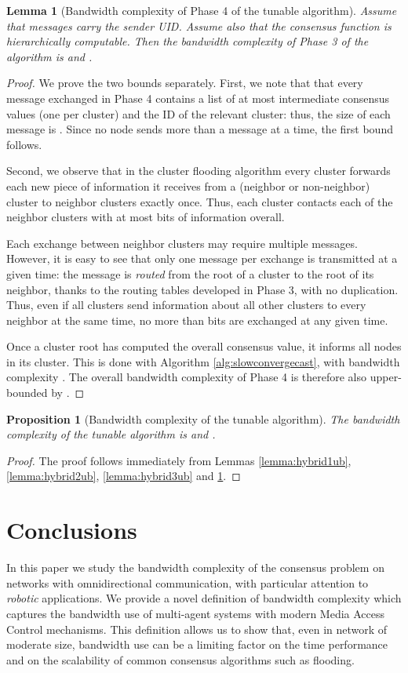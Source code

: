 \documentclass[letterpaper,10pt,conference]{ieeeconf}
\newtheorem{proposition}[theorem]{Proposition}
\newtheorem{lemma}[theorem]{Lemma}
\begin{document}
\begin{lemma}[Bandwidth complexity of Phase 4 of the tunable algorithm]
\label{lemma:hybrid4ub}
Assume that messages carry the sender UID. Assume also that the consensus function is hierarchically computable. Then the bandwidth complexity of Phase 3 of the algorithm is  and  .
\end{lemma}
\begin{proof}
We prove the two bounds separately. First, we note that that every message exchanged in Phase 4 contains a list of at most  intermediate consensus values (one per cluster) and the ID of the relevant cluster: thus, the size of each message is . Since no node sends more than a message at a time, the first bound follows.

Second, we observe that in the cluster flooding algorithm every cluster forwards each new piece of information it receives from a (neighbor or non-neighbor) cluster to neighbor clusters exactly once. Thus, each cluster contacts each of the  neighbor clusters with at most  bits of information overall.

Each exchange between neighbor clusters may require multiple messages. However, it is easy to see that only one message per exchange is transmitted at a given time: the message is \emph{routed} from the root of a cluster to the root of its neighbor, thanks to the routing tables developed in Phase 3, with no duplication. Thus, even if all  clusters send information about all  other clusters to every neighbor at the same time, no more than  bits are exchanged at any given time.

Once a cluster root has computed the overall consensus value, it informs all nodes in its cluster. This is done with Algorithm \ref{alg:slowconvergecast}, with bandwidth complexity . The overall bandwidth complexity of Phase 4 is therefore also upper-bounded by .
\end{proof}



\begin{proposition}[Bandwidth complexity of the tunable algorithm]
The bandwidth complexity of the tunable algorithm is  and .
\end{proposition}
\begin{proof}
The proof follows immediately from Lemmas \ref{lemma:hybrid1ub}, \ref{lemma:hybrid2ub}, \ref{lemma:hybrid3ub} and \ref{lemma:hybrid4ub}.
\end{proof}


\section{Conclusions}
\label{sec:conclusions}
In this paper we study the bandwidth complexity of the consensus problem on networks with omnidirectional communication, with particular attention to \emph{robotic} applications. We provide a novel  definition of bandwidth complexity which captures the bandwidth use of multi-agent systems with  modern Media Access Control mechanisms. 
This definition allows us to show that, even in network of moderate size, bandwidth use can be a limiting factor on the time performance and on the scalability of common consensus algorithms such as flooding.
\end{document}
